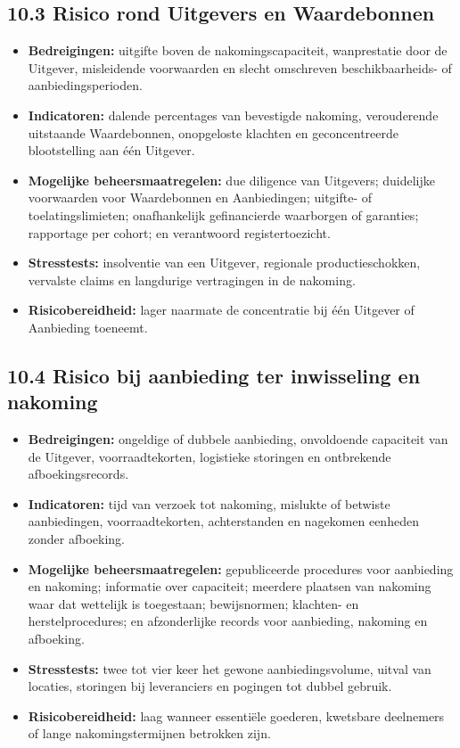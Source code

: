 \documentclass[11pt]{article}
\begin{document}
\subsection*{10.3 Risico rond Uitgevers en Waardebonnen}

\begin{itemize}[leftmargin=*]
\item \textbf{Bedreigingen:} uitgifte boven de nakomingscapaciteit, wanprestatie door de Uitgever, misleidende voorwaarden en slecht omschreven beschikbaarheids- of aanbiedingsperioden.
\item \textbf{Indicatoren:} dalende percentages van bevestigde nakoming, verouderende uitstaande Waardebonnen, onopgeloste klachten en geconcentreerde blootstelling aan één Uitgever.
\item \textbf{Mogelijke beheersmaatregelen:} due diligence van Uitgevers; duidelijke voorwaarden voor Waardebonnen en Aanbiedingen; uitgifte- of toelatingslimieten; onafhankelijk gefinancierde waarborgen of garanties; rapportage per cohort; en verantwoord registertoezicht.
\item \textbf{Stresstests:} insolventie van een Uitgever, regionale productieschokken, vervalste claims en langdurige vertragingen in de nakoming.
\item \textbf{Risicobereidheid:} lager naarmate de concentratie bij één Uitgever of Aanbieding toeneemt.
\end{itemize}
\subsection*{10.4 Risico bij aanbieding ter inwisseling en nakoming}

\begin{itemize}[leftmargin=*]
\item \textbf{Bedreigingen:} ongeldige of dubbele aanbieding, onvoldoende capaciteit van de Uitgever, voorraadtekorten, logistieke storingen en ontbrekende afboekingsrecords.
\item \textbf{Indicatoren:} tijd van verzoek tot nakoming, mislukte of betwiste aanbiedingen, voorraadtekorten, achterstanden en nagekomen eenheden zonder afboeking.
\item \textbf{Mogelijke beheersmaatregelen:} gepubliceerde procedures voor aanbieding en nakoming; informatie over capaciteit; meerdere plaatsen van nakoming waar dat wettelijk is toegestaan; bewijsnormen; klachten- en herstelprocedures; en afzonderlijke records voor aanbieding, nakoming en afboeking.
\item \textbf{Stresstests:} twee tot vier keer het gewone aanbiedingsvolume, uitval van locaties, storingen bij leveranciers en pogingen tot dubbel gebruik.
\item \textbf{Risicobereidheid:} laag wanneer essentiële goederen, kwetsbare deelnemers of lange nakomingstermijnen betrokken zijn.
\end{itemize}
\end{document}
